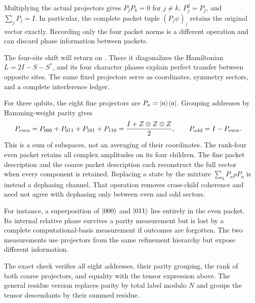 Multiplying the actual projectors gives $P_jP_k=0$ for $j\ne k$, $P_j^2=P_j$, and $\sum_jP_j=I$. In particular, the complete packet tuple $(P_j\psi)_j$ retains the original vector exactly. Recording only the four packet norms is a different operation and can discard phase information between packets.

The four-site shift will return on . There it diagonalizes the Hamiltonian $L=2I-S-S^*$, and its four character phases explain perfect transfer between opposite sites. The same fixed projectors serve as coordinates, symmetry sectors, and a complete interference ledger.

For three qubits, the eight fine projectors are $P_a=\lvert a\rangle\langle a\rvert$. Grouping addresses by Hamming-weight parity gives
\[
P_{\rm even}=P_{000}+P_{011}+P_{101}+P_{110}
=\frac{I+Z\otimes Z\otimes Z}{2},
\qquad P_{\rm odd}=I-P_{\rm even}.
\]
This is a sum of subspaces, not an averaging of their coordinates. The rank-four even packet retains all complex amplitudes on its four children.
The fine packet description and the coarse packet description each reconstruct the full vector when every component is retained. Replacing a state by the mixture $\sum_aP_a\rho P_a$ is instead a dephasing channel. That operation removes cross-child coherence and need not agree with dephasing only between even and odd sectors.

For instance, a superposition of $\lvert 000\rangle$ and $\lvert 011\rangle$ lies entirely in the even packet. Its internal relative phase survives a parity measurement but is lost by a complete computational-basis measurement if outcomes are forgotten. The two measurements use projectors from the same refinement hierarchy but expose different information.

The exact check verifies all eight addresses, their parity grouping, the rank of both coarse projectors, and equality with the tensor expression above. The general residue version replaces parity by total label modulo $N$ and groups the tensor descendants by their summed residue.

